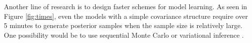 \documentclass{article}
\begin{document}

Another line of research is to design faster schemes for model learning. As seen in Figure \ref{fig:times}, even the models with a simple covariance structure require over 5 minutes to generate posterior samples when the sample size is relatively large. One possibility would be to use sequential Monte Carlo \citep{stewart1992, gordon1993, kitagawa1996} or variational inference \citep{jordan1999, wainwright2008}.




\clearpage
\small


\end{document}
